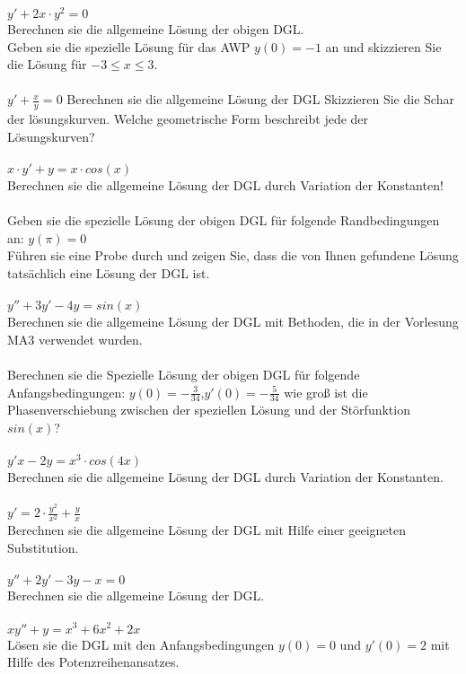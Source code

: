 \documentclass[A4]{scrartcl}
\begin{document}
$y'+2x\cdot y^2 = 0 $\\
Berechnen sie die allgemeine Lösung der obigen DGL.\\
Geben sie die spezielle Lösung für das AWP $y(0) = -1 $ an und skizzieren Sie die Lösung für $-3 \leq x \leq 3$. \\\\
$y' + \frac{x}{y} = 0$
Berechnen sie die allgemeine Lösung der DGL
Skizzieren Sie die Schar der lösungskurven. Welche geometrische Form beschreibt jede der Lösungskurven?\\\\
$x \cdot y' + y = x \cdot cos(x)$\\
Berechnen sie die allgemeine Lösung der DGL durch Variation der Konstanten!\\\\
Geben sie die spezielle Lösung der obigen DGL für folgende Randbedingungen an: $y(\pi ) = 0$\\
Führen sie eine Probe durch und zeigen Sie, dass die von Ihnen gefundene Lösung tatsächlich eine Lösung der DGL ist.\\\\
$y''+3y'-4y = sin (x)$\\
Berechnen sie die allgemeine Lösung der DGL mit Bethoden, die in der Vorlesung MA3 verwendet wurden.\\\\
Berechnen sie die Spezielle Lösung der obigen DGL für folgende Anfangsbedingungen:
$y(0)=-\frac{3}{34}$,$y'(0) = -\frac{5}{34}$
wie groß ist die Phasenverschiebung zwischen der speziellen Lösung und der Störfunktion $sin(x)$?\\\\
$y'x-2y=x^3 \cdot cos(4x)$\\
Berechnen sie die allgemeine Lösung der DGL durch Variation der Konstanten. \\\\
$y' = 2 \cdot \frac{y^2}{x^2}+\frac{y}{x}$\\
Berechnen sie die allgemeine Lösung der DGL mit Hilfe einer geeigneten Substitution.\\\\
$y''+2y'-3y-x=0$\\
Berechnen sie die allgemeine Lösung der DGL.\\\\
$xy''+y = x^3 +6x^2 +2x$\\
Lösen sie die DGL mit den Anfangsbedingungen $y(0) = 0 $ und $y'(0) = 2$ mit Hilfe des Potenzreihenansatzes.\\
\end{document}
